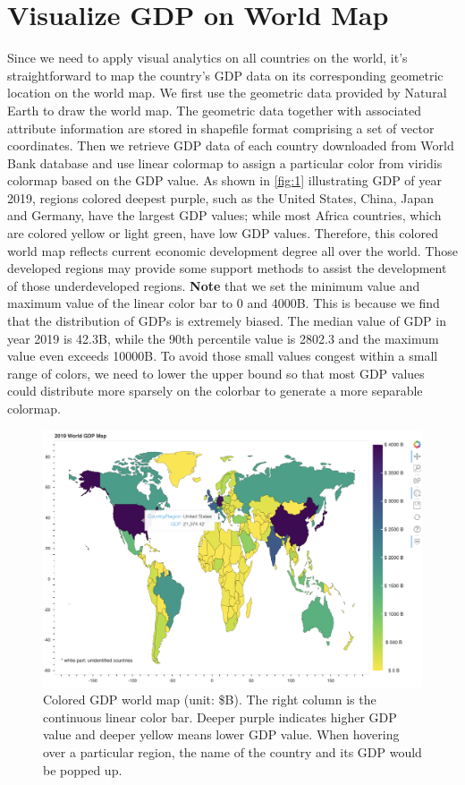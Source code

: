 \documentclass{vgtc}                          %
\begin{document}
\section{Visualize GDP on World Map}
Since we need to apply visual analytics on all countries on the world, it's straightforward to map the country's GDP data on its corresponding geometric location on the world map. We first use the geometric data provided by Natural Earth\cite{natrualearth:2018} to draw the world map. The geometric data together with associated attribute information are stored in shapefile format comprising a set of vector coordinates\cite{esri:1998:shapefile}. Then we retrieve GDP data of each country downloaded from World Bank database and use linear colormap to assign a particular color from viridis colormap based on the GDP value. As shown in \autoref{fig:1} illustrating GDP of year 2019, regions colored deepest purple, such as the United States, China, Japan and Germany, have the largest GDP values; while most Africa countries, which are colored yellow or light green, have low GDP values. Therefore, this colored world map reflects current economic development degree all over the world. Those developed regions may provide some support methods to assist the development of those underdeveloped regions. \textbf{Note} that we set the minimum value and maximum value of the linear color bar to 0 and 4000B. This is because we find that the distribution of GDPs is extremely biased. The median value of GDP in year 2019 is 42.3B, while the 90th percentile value is 2802.3 and the maximum value even exceeds 10000B. To avoid those small values congest within a small range of colors, we need to lower the upper bound so that most GDP values could distribute more sparsely on the colorbar to generate a more separable colormap. 

\begin{figure}[tb]
  \centering
  \includegraphics[width=\columnwidth]{hover_gdp.png}
  \caption{Colored GDP world map (unit: \$B). The right column is the continuous linear color bar. Deeper purple indicates higher GDP value and deeper yellow means lower GDP value. When hovering over a particular region, the name of the country and its GDP would be popped up.}
  \label{fig:1}
\end{figure}
\end{document}
